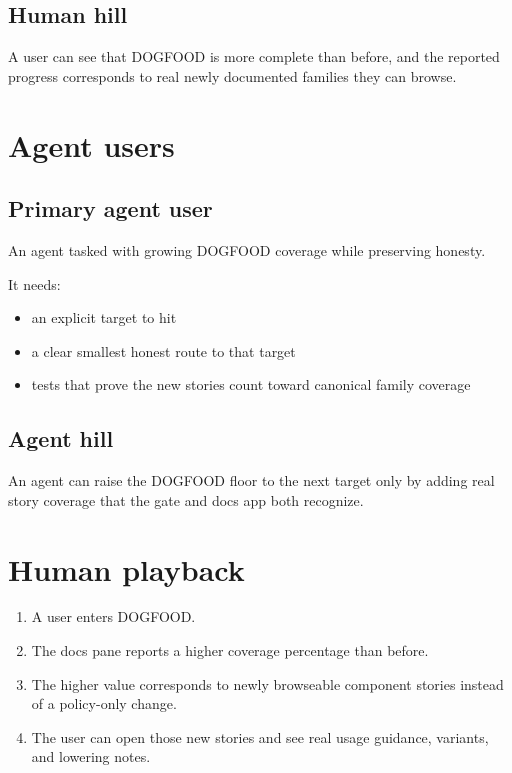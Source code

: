 \subsection{Human hill}\label{record-066-human-hill}

A user can see that DOGFOOD is more complete than before, and the reported progress corresponds to real newly documented families they can browse.

\section{Agent users}\label{record-066-agent-users}

\subsection{Primary agent user}\label{record-066-primary-agent-user}

An agent tasked with growing DOGFOOD coverage while preserving honesty.

It needs:

\begin{itemize}
\tightlist
\item
  an explicit target to hit
\item
  a clear smallest honest route to that target
\item
  tests that prove the new stories count toward canonical family coverage
\end{itemize}

\subsection{Agent hill}\label{record-066-agent-hill}

An agent can raise the DOGFOOD floor to the next target only by adding real story coverage that the gate and docs app both recognize.

\section{Human playback}\label{record-066-human-playback}

\begin{enumerate}
\def\labelenumi{\arabic{enumi}.}
\tightlist
\item
  A user enters DOGFOOD.
\item
  The docs pane reports a higher coverage percentage than before.
\item
  The higher value corresponds to newly browseable component stories instead of a policy-only change.
\item
  The user can open those new stories and see real usage guidance, variants, and lowering notes.
\end{enumerate}

